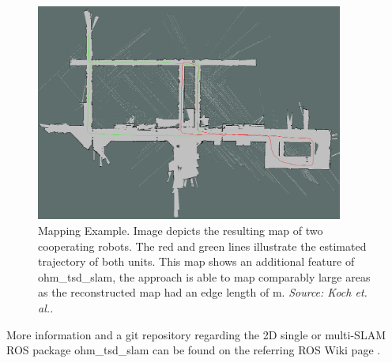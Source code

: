 \begin{figure}[h!]
\begin{center}
\includegraphics[width=0.9\textwidth]{img/multislam_big.png}
\end{center}
\caption{Mapping Example. Image depicts the resulting map of two cooperating robots. The red and green lines illustrate the estimated trajectory of both units. This map shows an additional feature of ohm\_tsd\_slam, the approach is able to map comparably large areas as the reconstructed map had an edge length of \unit[122]{m}. \textit{Source: Koch et. al.\cite{Koch2015}.}}
\label{fig:slam_map_expl}
\end{figure}


More information and a git repository regarding the 2D single or multi-SLAM ROS package ohm\_tsd\_slam can be found on the referring ROS Wiki page \cite{ohmtsdslam:ros}.

